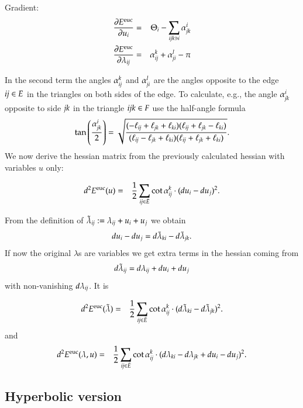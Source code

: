 \documentclass[Thesis]{subfiles}
\begin{document}
Gradient:
\begin{eqnarray}
	\frac{\partial E^{\rm euc}}{\partial u_i} &=& \Theta_i - \sum_{\it ijk\ni i}\alpha_{\it jk}^i \\
	\frac{\partial E^{\rm euc}}{\partial \lambda_{\it ij}} &=& \alpha_{\it ij}^k + \alpha_{\it ji}^l - \pi\label{eq:lambda_deriv_euc}
\end{eqnarray}

In the second term the angles $\alpha_{\it ij}^k$ and $\alpha_{\it ji}^l$ are the angles opposite to the edge $\it ij\in E$ in the 
triangles on both sides of the edge. To calculate, e.g., the angle $ \alpha_{\it jk}^i$ opposite to side $\it jk$ in the triangle $\it ijk \in F$ use the half-angle formula
\[\tan\left(\frac{ \alpha_{\it jk}^i}{2}\right) = \sqrt{\frac
{(-\ell_{\it ij} +\ell_{\it jk} +\ell_{\it ki})(\ell_{\it ij} +\ell_{\it jk} -\ell_{\it ki})}
{(\ell_{\it ij} -\ell_{\it jk} +\ell_{\it ki})(\ell_{\it ij} + \ell_{\it jk} +\ell_{\it ki})}}.\]
We now derive the hessian matrix from the previously calculated hessian with variables $u$ only:

\begin{eqnarray}
d^2E^{\rm euc}(u)&=&\frac{1}{2}\sum_{\it ij \in \bar E} \cot  \alpha_{\it ij}^k \cdot (du_i - du_j)^2.
\end{eqnarray}

From the definition of $\tilde\lambda_{\it ij} := \lambda_{\it ij}+u_i+u_j$ we obtain
\[du_i-du_j=d\tilde\lambda_{\it ki}-d\tilde\lambda_{\it jk}.\]
If now the original $\lambda$s are variables we get extra terms in the hessian coming from 
\[d\tilde\lambda_{\it ij}=d\lambda_{\it ij}+du_i+du_j\]
with non-vanishing $d\lambda_{\it ij}$. It is

\begin{eqnarray*}
d^2E^{\rm euc}(\tilde\lambda)
&=&\frac{1}{2}\sum_{\it ij \in \bar E} \cot  \alpha_{\it ij}^k \cdot (d\tilde\lambda_{\it ki}-d\tilde\lambda_{\it jk})^2.
\end{eqnarray*}
and
\begin{eqnarray*}
d^2E^{\rm euc}(\lambda, u)&=&\frac{1}{2}\sum_{\it ij \in \bar E} \cot  \alpha_{\it ij}^k \cdot (d\lambda_{\it ki}-d\lambda_{\it jk} + du_i - du_j)^2.
\end{eqnarray*}

\subsection{Hyperbolic version}
\end{document}
